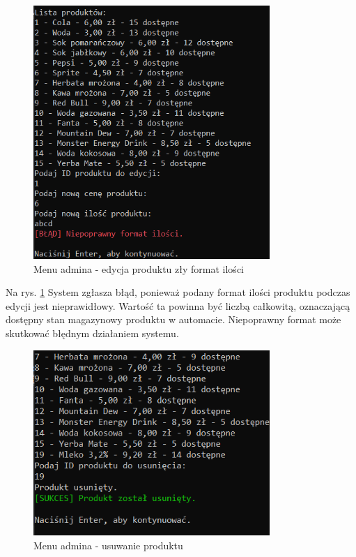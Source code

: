 \newpage

\begin{figure}[H] 
    \centering
    \includegraphics[width=0.8\textwidth]{grafiki/blad_ilosc_edycja.png}
    \caption{\footnotesize Menu admina - edycja produktu zły format ilości}	
    \label{fig:5.14}
\end{figure}
Na rys. \ref{fig:5.14} System zgłasza błąd, ponieważ podany format ilości produktu podczas edycji jest nieprawidłowy. Wartość ta powinna być liczbą całkowitą, oznaczającą dostępny stan magazynowy produktu w automacie. Niepoprawny format może skutkować błędnym działaniem systemu.

\newpage


\begin{figure}[H] 
    \centering
    \includegraphics[width=0.8\textwidth]{grafiki/usun_produkt.png}
    \caption{\footnotesize Menu admina - usuwanie produktu}	
    \label{fig:5.15}
\end{figure}

